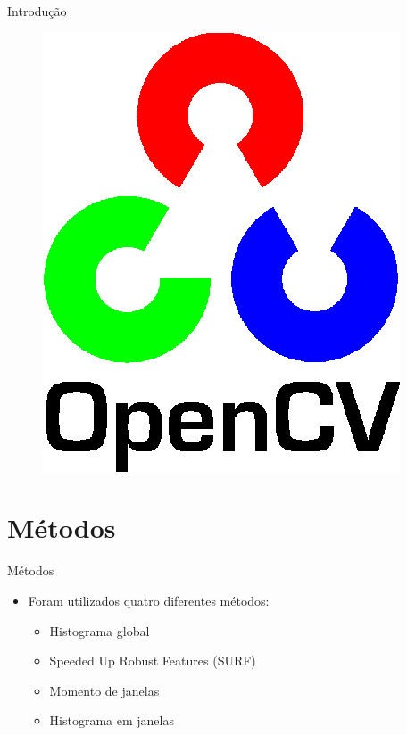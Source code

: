 \documentclass[
    style=paintings,
    paper=screen,
    blackslide,
    nopagebreaks,
    fleqn
]{powerdot}
\begin{document}
\begin{slide}{Introdução}
\begin{figure}
\pause\includegraphics[width=0.3\slidewidth]{img/opencv_logo_with_text}
\end{figure}
\end{slide}


\section[slide=false]{Métodos}
\begin{slide}{Métodos}
\begin{itemize}[type=1]
\item <1-> Foram utilizados quatro diferentes métodos:
\begin{itemize}[type=1]
\item <2-> Histograma global
\item <3-> Speeded Up Robust Features (SURF)
\item <4-> Momento de janelas
\item <5-> Histograma em janelas
\end{itemize}
\end{itemize}
\end{slide}
\end{document}
